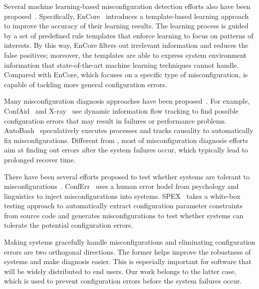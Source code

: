 Several machine learning-based misconfiguration detection efforts 
also have been proposed~\cite{yuan11context, zhang14encore}.
Specifically, EnCore~\cite{zhang14encore} introduces a template-based
learning approach to improve the accuracy of their learning results.
The learning process is guided by a set of predefined rule templates
that enforce learning to focus on patterns of interests.
By this way, EnCore filters out irrelevant information and reduces
the false positives; moreover, the templates are able to express
system environment information that state-of-the-art machine learning
techniques cannot handle.
Compared with EnCore, which focuses on a specific type of
misconfiguration, \app is capable of tackling more general configuration
errors.

Many misconfiguration diagnosis approaches have been proposed~\cite{}.
For example, ConfAid~\cite{} and X-ray~\cite{} use dynamic information
flow tracking to find possible configuration errors that may result in
failures or performance problems. AutoBash~\cite{} speculatively
executes processes and tracks causality to automatically fix 
misconfigurations. Different from \app, most of misconfiguration
diagnosis efforts aim at finding out errors after the system
failures occur, which typically lead to prolonged recover time.

There have been several efforts proposed to test whether systems are 
tolerant to misconfigurations~\cite{xu13do}. 
ConfErr~\cite{} uses a human error hodel from psychology and
linguistics to inject misconfigurations into systems.
SPEX~\cite{xu13do} takes a white-box testing approach to automatically
extract configuration parameter constraints from source code and generates 
misconfigurations to test whether systems can tolerate the potential
configuration errors.

Making systems gracefully handle misconfigurations and eliminating
configuration errors are two orthogonal directions.
The former helps improve the robustness of systems and make 
diagnosis easier. This is especially important for 
software that will be widely distributed to end users.
Our work belongs to the latter case, which is used to 
prevent configuration errors before the system failures occur.

